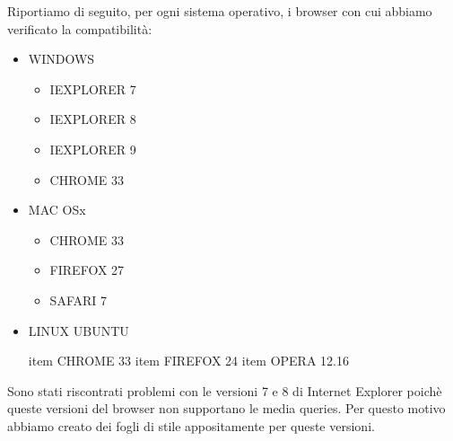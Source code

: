 Riportiamo di seguito, per ogni sistema operativo, i browser con cui abbiamo verificato la compatibilit\`a:
\begin{itemize}
		\item WINDOWS
		\begin{itemize}
			\item IEXPLORER 7
			\item IEXPLORER 8
			\item IEXPLORER 9
			\item CHROME 33
		\end{itemize}
		\item MAC OSx
		\begin{itemize}
			\item CHROME 33
			\item FIREFOX 27
			\item SAFARI 7
		\end{itemize}
		\item LINUX UBUNTU
		\begin{itemize}
			item CHROME 33
			item FIREFOX 24
			item OPERA 12.16
		\end{itemize}
\end{itemize}

Sono stati riscontrati problemi con le versioni 7 e 8 di Internet Explorer poich\`e queste versioni del browser non supportano le media queries. Per questo motivo abbiamo creato dei fogli di stile appositamente per queste versioni.
